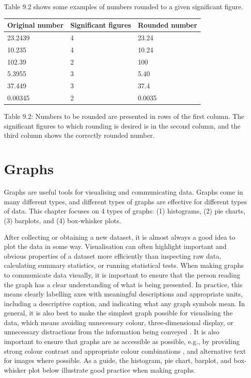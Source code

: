 \documentclass[
  openany]{scrbook}
\begin{document}
Table 9.2 shows some examples of numbers rounded to a given significant figure.

\begin{longtable}[]{@{}lll@{}}
\toprule
Original number & Significant figures & Rounded number \\
\midrule
\endhead
23.2439 & 4 & 23.24 \\
10.235 & 4 & 10.24 \\
102.39 & 2 & 100 \\
5.3955 & 3 & 5.40 \\
37.449 & 3 & 37.4 \\
0.00345 & 2 & 0.0035 \\
\bottomrule
\end{longtable}

Table 9.2: Numbers to be rounded are presented in rows of the first column. The significant figures to which rounding is desired is in the second column, and the third column shows the correctly rounded number.

\hypertarget{Chapter_10}{%
\chapter{Graphs}\label{Chapter_10}}

Graphs are useful tools for visualising and communicating data.
Graphs come in many different types, and different types of graphs are effective for different types of data.
This chapter focuses on 4 types of graphs: (1) histograms, (2) pie charts, (3) barplots, and (4) box-whisker plots.

After collecting or obtaining a new dataset, it is almost always a good idea to plot the data in some way.
Visualisation can often highlight important and obvious properties of a dataset more efficiently than inspecting raw data, calculating summary statistics, or running statistical tests.
When making graphs to communicate data visually, it is important to ensure that the person reading the graph has a clear understanding of what is being presented.
In practice, this means clearly labelling axes with meaningful descriptions and appropriate units, including a descriptive caption, and indicating what any graph symbols mean.
In general, it is also best to make the simplest graph possible for visualising the data, which means avoiding unnecessary colour, three-dimensional display, or unnecessary distractions from the information being conveyed \citep{Dytham2011, Kelleher2011}.
It is also important to ensure that graphs are as accessible as possible, e.g., by providing strong colour contrast and appropriate colour combinations \citep{Elavsky2022}, and alternative text for images where possible.
As a guide, the histogram, pie chart, barplot, and box-whisker plot below illustrate good practice when making graphs.
\end{document}
